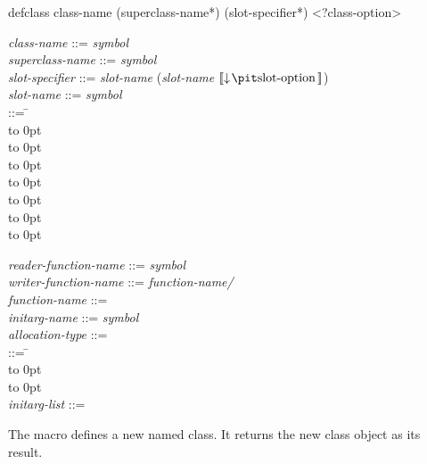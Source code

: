 \begin{defmac}
defclass class-name ({superclass-name}*)
         ({slot-specifier}*) <?class-option>

\begin{tabbing}
{\it class-name\/} ::= {\it symbol\/} \\
{\it superclass-name\/} ::= {\it symbol\/}\\
{\it slot-specifier\/} ::= {\it slot-name\/} {\Mor} ({\it slot-name\/}  $\lbrack\!\lbrack\downarrow\!\hbox{{\it slot-option}}\,\rbrack\!\rbrack$)\\
{\it slot-name\/} ::= {\it symbol\/}\\
 ::= \= \\
\>\hbox to 0pt{\hss\Mor~} \\
\>\hbox to 0pt{\hss\Mor~} \\
\>\hbox to 0pt{\hss\Mor~} \\
\>\hbox to 0pt{\hss\Mor~} \\
\>\hbox to 0pt{\hss\Mor~} \\
\>\hbox to 0pt{\hss\Mor~} \\
\>\hbox to 0pt{\hss\Mor~} \poptabs
\end{tabbing}
\begin{tabbing}
{\it reader-function-name\/} ::= {\it symbol\/}\\
{\it writer-function-name\/} ::= {\it function-name/}\\
{\it function-name\/} ::= \\
{\it initarg-name\/} ::= {\it symbol\/}\\
{\it allocation-type\/} ::= \\
 ::= \= \\
\>\hbox to 0pt{\hss\Mor~} \\
\>\hbox to 0pt{\hss\Mor~} \poptabs \\
{\it initarg-list\/} ::= 
\end{tabbing}
The macro  defines a new named class.  It returns the new class
object as its result.


\end{defmac}
